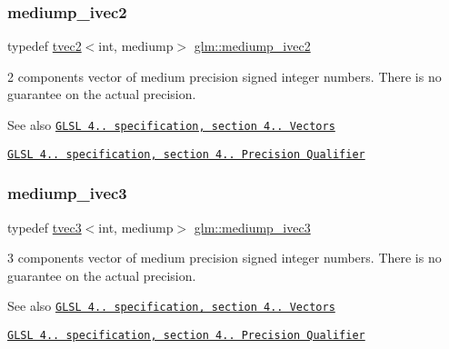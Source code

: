 \subsubsection{\texorpdfstring{mediump\+\_\+ivec2}{mediump\_ivec2}}
{\footnotesize\ttfamily typedef \hyperlink{structglm_1_1tvec2}{tvec2}$<$int, mediump$>$ \hyperlink{group__core__precision_ga38b24c06ac0dfe4dcfbe7abf9a93dbb4}{glm\+::mediump\+\_\+ivec2}}

2 components vector of medium precision signed integer numbers. There is no guarantee on the actual precision.

\begin{DoxySeeAlso}{See also}
\href{http://www.opengl.org/registry/doc/GLSLangSpec.4.20.8.pdf}{\tt G\+L\+SL 4.. specification, section 4.. Vectors} 

\href{http://www.opengl.org/registry/doc/GLSLangSpec.4.20.8.pdf}{\tt G\+L\+SL 4.. specification, section 4.. Precision Qualifier} 
\end{DoxySeeAlso}
\mbox{\label{group__core__precision_ga16a38c6077c2e83375ee258cd95e224b}} 
\subsubsection{\texorpdfstring{mediump\+\_\+ivec3}{mediump\_ivec3}}
{\footnotesize\ttfamily typedef \hyperlink{structglm_1_1tvec3}{tvec3}$<$int, mediump$>$ \hyperlink{group__core__precision_ga16a38c6077c2e83375ee258cd95e224b}{glm\+::mediump\+\_\+ivec3}}

3 components vector of medium precision signed integer numbers. There is no guarantee on the actual precision.

\begin{DoxySeeAlso}{See also}
\href{http://www.opengl.org/registry/doc/GLSLangSpec.4.20.8.pdf}{\tt G\+L\+SL 4.. specification, section 4.. Vectors} 

\href{http://www.opengl.org/registry/doc/GLSLangSpec.4.20.8.pdf}{\tt G\+L\+SL 4.. specification, section 4.. Precision Qualifier} 
\end{DoxySeeAlso}
\mbox{\label{group__core__precision_ga687eefa63b2c9d0969227eaf23b1ad41}} 
